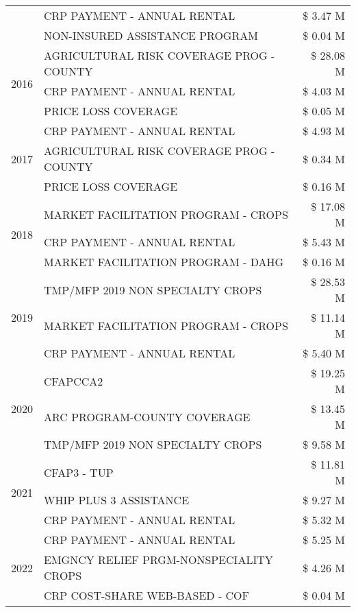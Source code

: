 \begin{tabular}{llr}
 & CRP PAYMENT - ANNUAL RENTAL & \$ 3.47 M \\
 & NON-INSURED ASSISTANCE PROGRAM & \$ 0.04 M \\
\cline{1-3}
\multirow[t]{3}{*}{2016} & AGRICULTURAL RISK COVERAGE PROG - COUNTY & \$ 28.08 M \\
 & CRP PAYMENT - ANNUAL RENTAL & \$ 4.03 M \\
 & PRICE LOSS COVERAGE & \$ 0.05 M \\
\cline{1-3}
\multirow[t]{3}{*}{2017} & CRP PAYMENT - ANNUAL RENTAL & \$ 4.93 M \\
 & AGRICULTURAL RISK COVERAGE PROG - COUNTY & \$ 0.34 M \\
 & PRICE LOSS COVERAGE & \$ 0.16 M \\
\cline{1-3}
\multirow[t]{3}{*}{2018} & MARKET FACILITATION PROGRAM - CROPS & \$ 17.08 M \\
 & CRP PAYMENT - ANNUAL RENTAL & \$ 5.43 M \\
 & MARKET FACILITATION PROGRAM - DAHG & \$ 0.16 M \\
\cline{1-3}
\multirow[t]{3}{*}{2019} & TMP/MFP 2019 NON SPECIALTY CROPS & \$ 28.53 M \\
 & MARKET FACILITATION PROGRAM - CROPS & \$ 11.14 M \\
 & CRP PAYMENT - ANNUAL RENTAL & \$ 5.40 M \\
\cline{1-3}
\multirow[t]{3}{*}{2020} & CFAPCCA2 & \$ 19.25 M \\
 & ARC PROGRAM-COUNTY COVERAGE & \$ 13.45 M \\
 & TMP/MFP 2019 NON SPECIALTY CROPS & \$ 9.58 M \\
\cline{1-3}
\multirow[t]{3}{*}{2021} & CFAP3 - TUP & \$ 11.81 M \\
 & WHIP PLUS 3 ASSISTANCE & \$ 9.27 M \\
 & CRP PAYMENT - ANNUAL RENTAL & \$ 5.32 M \\
\cline{1-3}
\multirow[t]{3}{*}{2022} & CRP PAYMENT - ANNUAL RENTAL & \$ 5.25 M \\
 & EMGNCY RELIEF PRGM-NONSPECIALITY CROPS & \$ 4.26 M \\
 & CRP COST-SHARE WEB-BASED - COF & \$ 0.04 M \\
\cline{1-3}
\bottomrule
\end{tabular}
